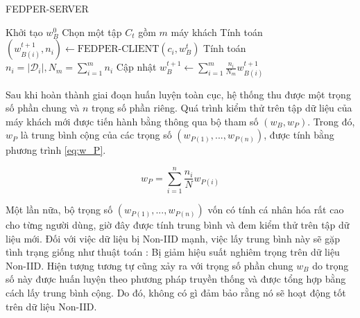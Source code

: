 \begin{algorithm}
    \caption{FEDPER-SERVER \cite{arivazhagan2019federated}} \label{alg:fedper_server}
    \begin{algorithmic}[1]
        \State Khởi tạo $w_{B}^{0}$
            \State Chọn một tập $C_t$ gồm $m$ máy khách
                \State Tính toán $(w_{B(i)}^{t+1}, n_i) \gets \text{FEDPER-CLIENT}(c_i, w_B^t)$
            \EndFor
            \State Tính toán $n_i = \left| \mathcal{D}_i \right|, N_m = \sum_{i=1}^m n_i$
            \State Cập nhật $w_B^{t+1} \gets \sum_{i=1}^m \frac{n_i}{N_m} w_{B(i)}^{t+1}$
        \EndFor
    \end{algorithmic}
\end{algorithm}

Sau khi hoàn thành giai đoạn huấn luyện toàn cục, hệ thống thu được một trọng số phần chung và $n$ trọng số phần riêng. Quá trình kiểm thử trên tập dữ liệu của máy khách mới được tiến hành bằng thông qua bộ tham số $(w_B, w_P)$. Trong đó, $w_P$ là trung bình cộng của các trọng số $(w_{P(1)},...,w_{P(n)})$, được tính bằng phương trình \ref{eq:w_P}.

\begin{dmath}
    \label{eq:w_P}
    w_P = \sum_{i=1}^n \frac{n_i}{N}w_{P(i)}
\end{dmath}


Một lần nữa, bộ trọng số $(w_{P(1)},...,w_{P(n)})$ vốn có tính cá nhân hóa rất cao cho từng người dùng, giờ đây được tính trung bình và đem kiểm thử trên tập dữ liệu mới. Đối với việc dữ liệu bị Non-IID mạnh, việc lấy trung bình này sẽ gặp tình trạng giống như thuật toán : Bị giảm hiệu suất nghiêm trọng trên dữ liệu Non-IID. Hiện tượng tương tự cũng xảy ra với trọng số phần chung $w_B$ do trọng số này được huấn luyện theo phương pháp truyền thống và được tổng hợp bằng cách lấy trung bình cộng. Do đó, không có gì đảm bảo rằng nó sẽ hoạt động tốt trên dữ liệu Non-IID.


